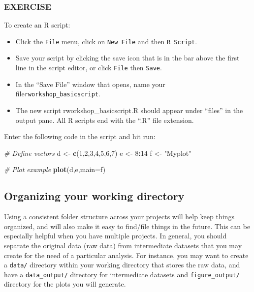 \documentclass[]{book}
\newenvironment{Shaded}{\begin{snugshade}}{\end{snugshade}}
\newcommand{\CommentTok}[1]{\textcolor[rgb]{0.56,0.35,0.01}{\textit{#1}}}
\newcommand{\DataTypeTok}[1]{\textcolor[rgb]{0.13,0.29,0.53}{#1}}
\newcommand{\DecValTok}[1]{\textcolor[rgb]{0.00,0.00,0.81}{#1}}
\newcommand{\KeywordTok}[1]{\textcolor[rgb]{0.13,0.29,0.53}{\textbf{#1}}}
\newcommand{\NormalTok}[1]{#1}
\newcommand{\OperatorTok}[1]{\textcolor[rgb]{0.81,0.36,0.00}{\textbf{#1}}}
\newcommand{\StringTok}[1]{\textcolor[rgb]{0.31,0.60,0.02}{#1}}
\providecommand{\tightlist}{%
  \setlength{\itemsep}{0pt}\setlength{\parskip}{0pt}}
\begin{document}
\hypertarget{exercise-1}{%
\subsubsection*{EXERCISE}\label{exercise-1}}

To create an R script:

\begin{itemize}
\tightlist
\item
  Click the \texttt{File} menu, click on \texttt{New\ File} and then \texttt{R\ Script}.
\item
  Save your script by clicking the save icon that is in the bar above the first line in the script editor, or click \texttt{File} then \texttt{Save}.
\item
  In the ``Save File'' window that opens, name your file\texttt{rworkshop\_basicscript}.
\item
  The new script rworkshop\_basicscript.R should appear under ``files'' in the output pane. All R scripts end with the ``.R'' file extension.
\end{itemize}

Enter the following code in the script and hit run:

\begin{Shaded}
\begin{Highlighting}[]
\CommentTok{# Define vectors}
\NormalTok{d <-}\StringTok{ }\KeywordTok{c}\NormalTok{(}\DecValTok{1}\NormalTok{,}\DecValTok{2}\NormalTok{,}\DecValTok{3}\NormalTok{,}\DecValTok{4}\NormalTok{,}\DecValTok{5}\NormalTok{,}\DecValTok{6}\NormalTok{,}\DecValTok{7}\NormalTok{)}
\NormalTok{e <-}\StringTok{ }\DecValTok{8}\OperatorTok{:}\DecValTok{14}
\NormalTok{f <-}\StringTok{ "Myplot"}

\CommentTok{# Plot example}
\KeywordTok{plot}\NormalTok{(d,e,}\DataTypeTok{main=}\NormalTok{f)}
\end{Highlighting}
\end{Shaded}

\hypertarget{organizing-your-working-directory}{%
\subsection*{Organizing your working directory}\label{organizing-your-working-directory}}

Using a consistent folder structure across your projects will help keep things organized, and will also make it easy to find/file things in the future. This can be especially helpful when you have multiple projects. In general, you should separate the original data (raw data) from intermediate datasets that you may create for the need of a particular analysis. For instance, you may want to create a \texttt{data/} directory within your working directory that stores the raw data, and have a \texttt{data\_output/} directory for intermediate datasets and \texttt{figure\_output/} directory for the plots you will generate.
\end{document}
